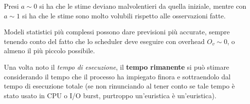 \documentclass[a4paper,11pt]{article}
\begin{document}
Presi $a \sim 0$ si ha che le stime deviano malvolentieri da quella iniziale, mentre con $a \sim 1$ si ha che le stime sono molto volubili rispetto alle osservazioni fatte. 

Modeli statistici più complessi possono dare previsioni più accurate, sempre tenendo conto del fatto che lo scheduler deve eseguire con overhead $O_v \sim 0$, o almeno il più piccolo possibile.

Una volta noto il \textit{tempo di esecuzione}, il \textbf{tempo rimanente} si può stimare considerando il tempo che il processo ha impiegato finora e sottraendolo dal tempo di esecuzione totale (se non rinunciando al tener conto se tale tempo è stato usato in CPU o I/O burst, purtroppo un'euristica è un'euristica).
\end{document}
